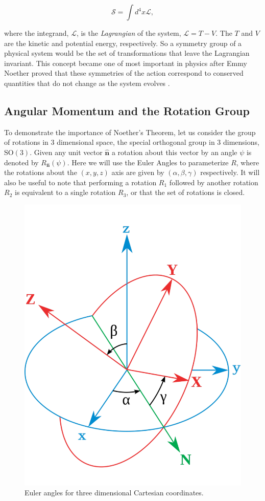 \begin{equation}
\label{eq:action}
\mathcal{S} = \int d^{4}x{\mathscr{L}},
\end{equation}

where the integrand, $\mathscr{L}$, is the \textit{Lagrangian} of the system, $\mathscr{L} = T - V$. The $T$ and $V$ are the kinetic and potential energy, respectively. So a symmetry group of a physical system would be the set of transformations that leave the Lagrangian invariant. This concept became one of most important in physics after Emmy Noether proved that these symmetries of the action correspond to conserved quantities that do not change as the system evolves \cite{Noether:1918zz}.

\subsection{Angular Momentum and the Rotation Group}
\label{sec:AngularMomentum}

To demonstrate the importance of Noether's Theorem, let us consider the group of rotations in 3 dimensional space, the special orthogonal group in 3 dimensions, $\mathrm{SO}(3)$. Given any unit vector $\hat{\textbf{n}}$ a rotation about this vector by an angle $\psi$ is denoted by $R_{\hat{\textbf{n}}}(\psi)$. Here we will use the Euler Angles to parameterize $R$, where the rotations about the $(x,y,z)$ axis are given by $(\alpha, \beta, \gamma)$ respectively. It will also be useful to note that performing a rotation $R_{1}$ followed by another rotation $R_{2}$ is equivalent to a single rotation $R_{3}$, or that the set of rotations is closed.

\begin{figure}
\begin{center}
\includegraphics[width=0.5\linewidth]{Introduction/Euler.pdf}
\caption[Euler angles for three dimensional Cartesian coordinates.]{Euler angles for three dimensional Cartesian coordinates.\cite{wiki:Euler}}
\label{fig:Euler}
\end{center}
\end{figure}


